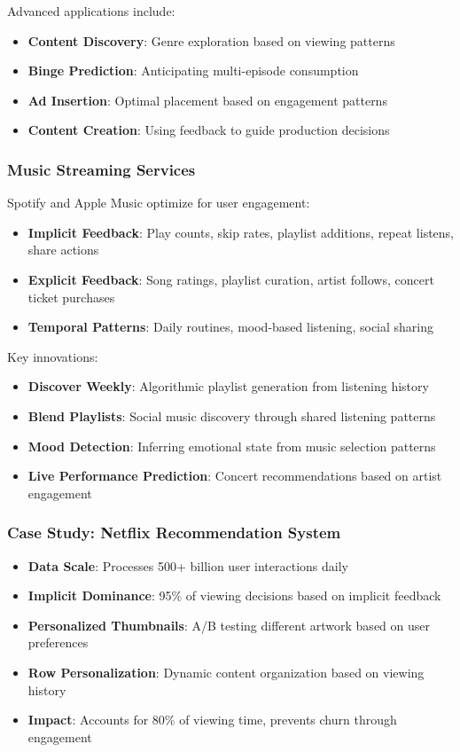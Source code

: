 Advanced applications include:
\begin{itemize}
    \item \textbf{Content Discovery}: Genre exploration based on viewing patterns
    \item \textbf{Binge Prediction}: Anticipating multi-episode consumption
    \item \textbf{Ad Insertion}: Optimal placement based on engagement patterns
    \item \textbf{Content Creation}: Using feedback to guide production decisions
\end{itemize}

\subsubsection{Music Streaming Services}

Spotify and Apple Music optimize for user engagement:

\begin{itemize}
    \item \textbf{Implicit Feedback}: Play counts, skip rates, playlist additions, repeat listens, share actions
    \item \textbf{Explicit Feedback}: Song ratings, playlist curation, artist follows, concert ticket purchases
    \item \textbf{Temporal Patterns}: Daily routines, mood-based listening, social sharing
\end{itemize}

Key innovations:
\begin{itemize}
    \item \textbf{Discover Weekly}: Algorithmic playlist generation from listening history
    \item \textbf{Blend Playlists}: Social music discovery through shared listening patterns
    \item \textbf{Mood Detection}: Inferring emotional state from music selection patterns
    \item \textbf{Live Performance Prediction}: Concert recommendations based on artist engagement
\end{itemize}

\subsubsection{Case Study: Netflix Recommendation System}

\begin{itemize}
    \item \textbf{Data Scale}: Processes 500+ billion user interactions daily
    \item \textbf{Implicit Dominance}: 95\% of viewing decisions based on implicit feedback
    \item \textbf{Personalized Thumbnails}: A/B testing different artwork based on user preferences
    \item \textbf{Row Personalization}: Dynamic content organization based on viewing history
    \item \textbf{Impact}: Accounts for 80\% of viewing time, prevents churn through engagement
\end{itemize}

